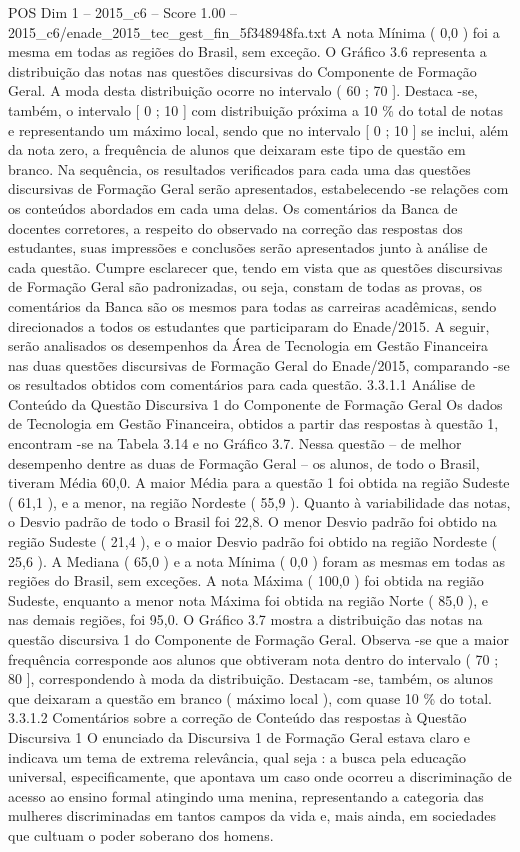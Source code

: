 \begin{textsample}{POS Dim 1 – 2015\_c6 – Score 1.00 – 2015\_c6/enade\_2015\_tec\_gest\_fin\_5f348948fa.txt}
A nota Mínima ( 0,0 ) foi a mesma em todas as regiões do Brasil, sem exceção.
O Gráfico 3.6 representa a distribuição das notas nas questões discursivas do Componente de Formação Geral.
A moda desta distribuição ocorre no intervalo ( 60 ; 70 ].
Destaca -se, também, o intervalo [ 0 ; 10 ] com distribuição próxima a 10 \% do total de notas e representando um máximo local, sendo que no intervalo [ 0 ; 10 ] se inclui, além da nota zero, a frequência de alunos que deixaram este tipo de questão em branco.
Na sequência, os resultados verificados para cada uma das questões discursivas de Formação Geral serão apresentados, estabelecendo -se relações com os conteúdos abordados em cada uma delas.
Os comentários da Banca de docentes corretores, a respeito do observado na correção das respostas dos estudantes, suas impressões e conclusões serão apresentados junto à análise de cada questão.
Cumpre esclarecer que, tendo em vista que as questões discursivas de Formação Geral são padronizadas, ou seja, constam de todas as provas, os comentários da Banca são os mesmos para todas as carreiras acadêmicas, sendo direcionados a todos os estudantes que participaram do Enade/2015.
A seguir, serão analisados os desempenhos da Área de Tecnologia em Gestão Financeira nas duas questões discursivas de Formação Geral do Enade/2015, comparando -se os resultados obtidos com comentários para cada questão. 3.3.1.1 Análise de Conteúdo da Questão Discursiva 1 do Componente de Formação Geral Os dados de Tecnologia em Gestão Financeira, obtidos a partir das respostas à questão 1, encontram -se na Tabela 3.14 e no Gráfico 3.7.
Nessa questão – de melhor desempenho dentre as duas de Formação Geral – os alunos, de todo o Brasil, tiveram Média 60,0.
A maior Média para a questão 1 foi obtida na região Sudeste ( 61,1 ), e a menor, na região Nordeste ( 55,9 ).
Quanto à variabilidade das notas, o Desvio padrão de todo o Brasil foi 22,8.
O menor Desvio padrão foi obtido na região Sudeste ( 21,4 ), e o maior Desvio padrão foi obtido na região Nordeste ( 25,6 ).
A Mediana ( 65,0 ) e a nota Mínima ( 0,0 ) foram as mesmas em todas as regiões do Brasil, sem exceções.
A nota Máxima ( 100,0 ) foi obtida na região Sudeste, enquanto a menor nota Máxima foi obtida na região Norte ( 85,0 ), e nas demais regiões, foi 95,0.
O Gráfico 3.7 mostra a distribuição das notas na questão discursiva 1 do Componente de Formação Geral.
Observa -se que a maior frequência corresponde aos alunos que obtiveram nota dentro do intervalo ( 70 ; 80 ], correspondendo à moda da distribuição.
Destacam -se, também, os alunos que deixaram a questão em branco ( máximo local ), com quase 10 \% do total. 3.3.1.2 Comentários sobre a correção de Conteúdo das respostas à Questão Discursiva 1 O enunciado da Discursiva 1 de Formação Geral estava claro e indicava um tema de extrema relevância, qual seja : a busca pela educação universal, especificamente, que apontava um caso onde ocorreu a discriminação de acesso ao ensino formal atingindo uma menina, representando a categoria das mulheres discriminadas em tantos campos da vida e, mais ainda, em sociedades que cultuam o poder soberano dos homens.

\end{textsample}
